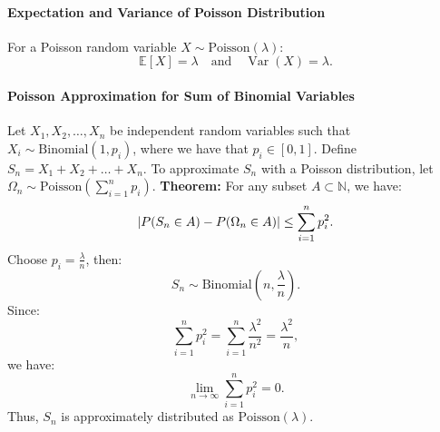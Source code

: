 \paragraph{Expectation and Variance of Poisson Distribution}
For a Poisson random variable \( X \sim \text{Poisson}(\lambda) \):
\[
\mathbb{E}[X] = \lambda \quad \text{and} \quad \operatorname{Var}(X) = \lambda.
\]

\paragraph{Poisson Approximation for Sum of Binomial Variables}
Let \( X_1, X_2, \dots, X_n \) be independent random variables such that \( X_i \sim \text{Binomial}(1, p_i) \), where we have that \( p_i \in [0, 1] \). Define \( S_n = X_1 + X_2 + \dots + X_n \). To approximate \( S_n \) with a Poisson distribution, let \( \Omega_n \sim \text{Poisson}\left( \sum_{i=1}^n p_i \right) \). \newline
\textbf{Theorem:} For any subset \( A \subset \mathbb{N} \), we have:
\[
\abs{P(S_n \in A) -  P(\Omega_n \in A)} \leq \sum_{i=1}^n p_i^2.
\]
Choose \( p_i = \frac{\lambda}{n} \), then:
\[
S_n \sim \text{Binomial}\left(n, \frac{\lambda}{n}\right).
\]
Since:
\[
\sum_{i=1}^n p_i^2 = \sum_{i=1}^n \frac{\lambda^2}{n^2} = \frac{\lambda^2}{n},
\]
we have:
\[
\lim_{n \to \infty} \sum_{i=1}^n p_i^2 = 0.
\]
Thus, \( S_n \) is approximately distributed as \( \text{Poisson}(\lambda) \).


